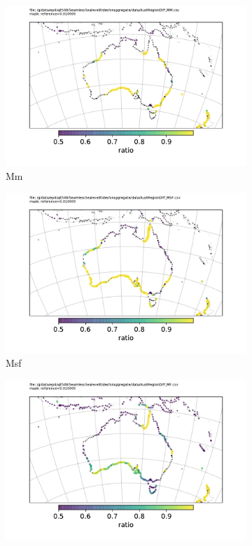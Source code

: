 \begin{figure}[!hbt]
\begin{subfigure}[b]{\figwidthHalf}
    \end{subfigure}
    \begin{subfigure}[b]{\figwidthHalf}
        \includegraphics[width=\textwidth]{figures/maps/AustRegionDiff_MM.pdf}
        \caption{Mm}
    \end{subfigure}
    \begin{subfigure}[b]{\figwidthHalf}
        \includegraphics[width=\textwidth]{figures/maps/AustRegionDiff_MSF.pdf}
        \caption{Msf}
    \end{subfigure}
    \begin{subfigure}[b]{\figwidthHalf}
        \includegraphics[width=\textwidth]{figures/maps/AustRegionDiff_MF.pdf}

\end{subfigure}
\end{figure}
